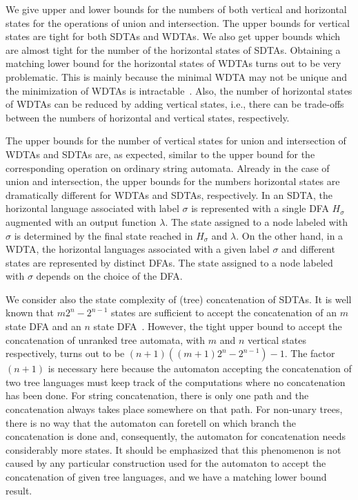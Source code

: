 \documentclass[copyright]{eptcs}
\begin{document}
We give upper  and lower bounds for
the numbers of both vertical and
horizontal states for the operations of union and intersection.
The upper bounds for vertical states
are tight for both SDTAs and WDTAs. We also get upper bounds which
are almost tight for the number
of the horizontal states of SDTAs. Obtaining
a matching
lower bound for the horizontal states of WDTAs turns out to be
very problematic. This is mainly because the minimal WDTA may not
be unique and the minimization of WDTAs is intractable~\cite{mn}.
Also, the number of horizontal states of WDTAs can be reduced by
adding vertical states, i.e., there can be trade-offs between
the numbers of horizontal and vertical states, respectively.

The upper bounds for the number of
 vertical states for union
and intersection of WDTAs and SDTAs are,
as expected, similar to the upper
bound for the corresponding operation on ordinary string automata.
Already in the case of union and intersection,
the upper bounds for the numbers
horizontal states  are dramatically different for WDTAs and
SDTAs, respectively.
In an SDTA, the
horizontal language associated with label $\sigma$ is represented
with a single DFA $H_\sigma$ augmented with an output function
$\lambda$. The state assigned to a node labeled with $\sigma$ is
determined by the final state reached in $H_\sigma$ and $\lambda$.
On the other hand, in a WDTA, the horizontal languages associated
with a given label $\sigma$ and different states are represented
by distinct DFAs. The state assigned to a node labeled with $\sigma$
depends on the choice of the DFA.

We consider also the state complexity of
 (tree)
concatenation of  SDTAs. It is well known
that $m2^n-2^{n-1}$ states are sufficient to accept the
concatenation of an $m$ state DFA and an $n$ state
DFA~\cite{YuZhSa94}. However, the tight upper bound to accept the
concatenation of
unranked tree automata,
with $m$ and $n$ vertical states respectively,
turns out to be $(n+1) ( (m+1)2^n-2^{n-1} )-1$. The
factor $(n+1)$ is necessary here because the automaton accepting
the concatenation of two tree languages must keep track of the
computations where no concatenation has been done. For string
concatenation, there is only one path and the concatenation always
takes place  somewhere on that path.
For non-unary trees, there is no way
that the automaton can foretell on which branch the concatenation
is done and, consequently, the automaton for concatenation needs
considerably more states.
 It should be emphasized
that this phenomenon is not caused by any particular construction
used for the automaton to accept the concatenation of given tree
languages, and we have a matching lower bound result.
\end{document}

